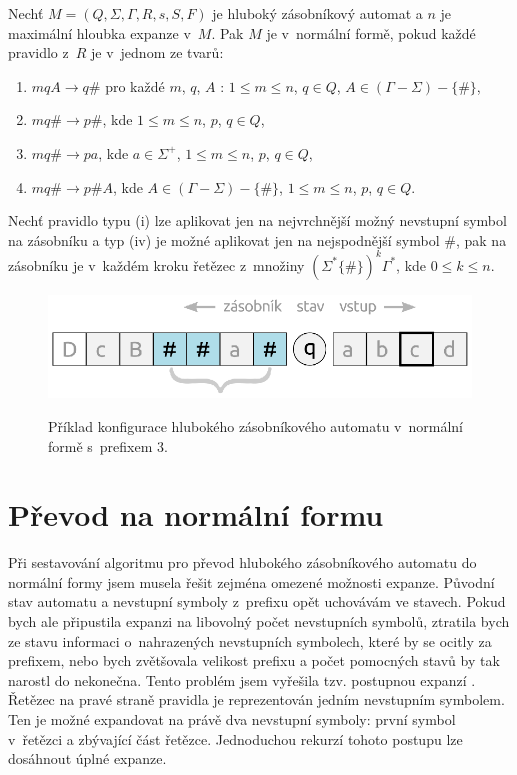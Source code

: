 \begin{Def}\label{def_NF}
Nechť $M = (Q,\Sigma,\Gamma, R, s, S , F)$ je hluboký zásobníkový automat
a $n$ je maximální hloubka expanze v~$M$.
Pak $M$ je v~normální formě, pokud každé pravidlo z~$R$ je v~jednom ze tvarů:

\begin{enumerate}
\renewcommand{\labelenumi}{(\roman{enumi})}

\item $mqA \rightarrow q\#$ pro každé $m$, $q$, $A$ : $1 \le m \le n$, $q \in Q$, $A \in (\Gamma - \Sigma) - \{\#\}$,
\item $mq\# \rightarrow p\#$, kde $1 \le m \le n$, $p$, $q \in Q$,
\item $mq\# \rightarrow pa$, kde $a \in {\Sigma}^+$, $1 \le m \le n$, $p$, $q \in Q$,
\item $mq\# \rightarrow p\#A$, kde $A \in (\Gamma - \Sigma) - \{\#\}$, $1 \le m \le n$, $p$, $q \in Q$.

\end{enumerate}

Nechť pravidlo typu (i) lze aplikovat jen na nejvrchnější možný nevstupní symbol na zásobníku a typ (iv) je možné aplikovat jen na nejspodnější symbol $\#$, pak na zásobníku je v~každém kroku řetězec z~množiny $ ( \Sigma^* \{ \# \} )^k  \Gamma^*$, kde $0 \le k \le n$. 

\end{Def}


\begin{figure}[ht]
\centering
\includegraphics{img/bp_pda04.eps} \bigskip \\
\caption{Příklad konfigurace hlubokého zásobníkového automatu v~normální formě s~prefixem 3.}
\end{figure}

\section{Převod na normální formu}

Při sestavování algoritmu pro převod hlubokého zásobníkového automatu do normální formy jsem musela řešit zejména omezené možnosti expanze. Původní stav automatu a nevstupní symboly z~prefixu opět uchovávám ve stavech. Pokud bych ale připustila expanzi na libovolný počet nevstupních symbolů, ztratila bych ze stavu informaci o~nahrazených nevstupních symbolech, které by se ocitly za prefixem, nebo bych zvětšovala velikost prefixu a počet pomocných stavů by tak narostl do nekonečna. Tento problém jsem vyřešila tzv. postupnou expanzí \cite{Meduna:Theory}. Řetězec na pravé straně pravidla je reprezentován jedním nevstupním symbolem. Ten je možné expandovat na právě dva nevstupní symboly: první symbol v~řetězci a zbývající část řetězce. Jednoduchou rekurzí tohoto postupu lze dosáhnout úplné expanze.

